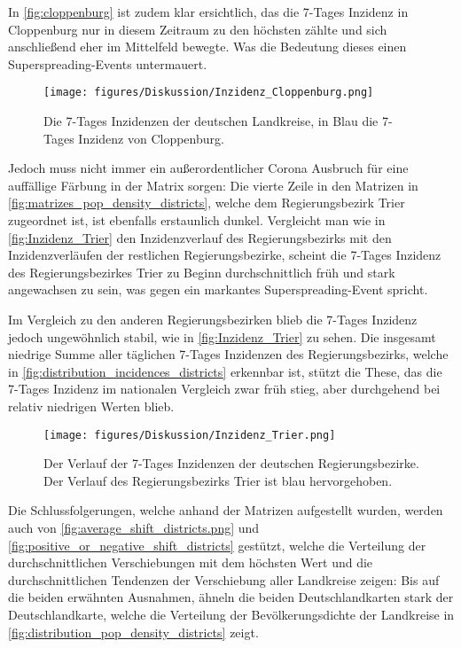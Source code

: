 In \autoref{fig:cloppenburg} ist zudem klar ersichtlich, das die 7-Tages Inzidenz in Cloppenburg nur in diesem Zeitraum zu den höchsten zählte und sich anschließend eher im Mittelfeld bewegte. Was die Bedeutung dieses einen Superspreading-Events untermauert.
\begin{figure}
    \centering
    \texttt{[image: figures/Diskussion/Inzidenz\_Cloppenburg.png]}
    \caption{Die 7-Tages Inzidenzen der deutschen Landkreise, in Blau die 7-Tages Inzidenz von Cloppenburg.}
    \label{fig:cloppenburg}
\end{figure}

Jedoch muss nicht immer ein außerordentlicher Corona Ausbruch für eine auffällige Färbung in der Matrix sorgen: Die vierte Zeile in den Matrizen in \autoref{fig:matrizes_pop_density_districts}, welche dem Regierungsbezirk Trier zugeordnet ist, ist ebenfalls erstaunlich dunkel.
Vergleicht man wie in \autoref{fig:Inzidenz_Trier} den Inzidenzverlauf des Regierungsbezirks mit den Inzidenzverläufen der restlichen Regierungsbezirke, scheint die 7-Tages Inzidenz des Regierungsbezirkes Trier zu Beginn durchschnittlich früh und stark angewachsen zu sein, was gegen ein markantes Superspreading-Event spricht.

Im Vergleich zu den anderen Regierungsbezirken blieb die 7-Tages Inzidenz jedoch ungewöhnlich stabil, wie in \autoref{fig:Inzidenz_Trier} zu sehen. Die insgesamt niedrige Summe aller täglichen 7-Tages Inzidenzen des Regierungsbezirks, welche in \autoref{fig:distribution_incidences_districts} erkennbar ist, stützt die These, das die 7-Tages Inzidenz im nationalen Vergleich zwar früh stieg, aber durchgehend bei relativ niedrigen Werten blieb.

\begin{figure}[H]
    \centering
    \texttt{[image: figures/Diskussion/Inzidenz\_Trier.png]}
    \caption{Der Verlauf der 7-Tages Inzidenzen der deutschen Regierungsbezirke. Der Verlauf des Regierungsbezirks Trier ist blau hervorgehoben.}
    \label{fig:Inzidenz_Trier}
\end{figure}



Die Schlussfolgerungen, welche anhand der Matrizen aufgestellt wurden, werden auch von \autoref{fig:average_shift_districts.png} und \autoref{fig:positive_or_negative_shift_districts} gestützt, welche die Verteilung der durchschnittlichen Verschiebungen mit dem höchsten Wert und die durchschnittlichen Tendenzen der Verschiebung aller Landkreise zeigen: Bis auf die beiden erwähnten Ausnahmen, ähneln die beiden Deutschlandkarten stark der Deutschlandkarte, welche die Verteilung der Bevölkerungsdichte der Landkreise in \autoref{fig:distribution_pop_density_districts} zeigt.


